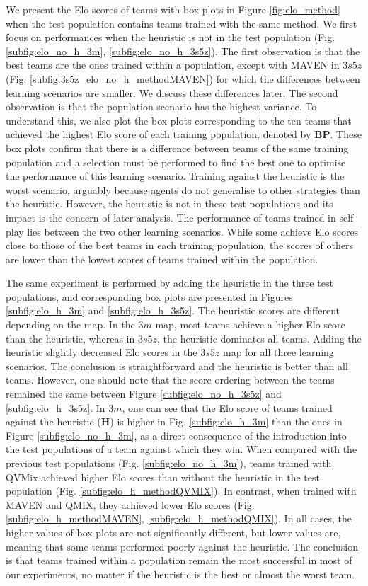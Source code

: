 We present the Elo scores of teams with box plots in Figure \ref{fig:elo_method} when the test population contains teams trained with the same method.
We first focus on performances when the heuristic is not in the test population (Fig. \ref{subfig:elo_no_h_3m}, \ref{subfig:elo_no_h_3s5z}).
The first observation is that the best teams are the ones trained within a population, except with MAVEN in $3s5z$ (Fig. \ref{subfig:3s5z_elo_no_h_methodMAVEN}) for which the differences between learning scenarios are smaller.
We discuss these differences later.
The second observation is that the population scenario has the highest variance.
To understand this, we also plot the box plots corresponding to the ten teams that achieved the highest Elo score of each training population, denoted by \textbf{BP}.
These box plots confirm that there is a difference between teams of the same training population and a selection must be performed to find the best one to optimise the performance of this learning scenario.
Training against the heuristic is the worst scenario, arguably because agents do not generalise to other strategies than the heuristic.
However, the heuristic is not in these test populations and its impact is the concern of later analysis.
The performance of teams trained in self-play lies between the two other learning scenarios.
While some achieve Elo scores close to those of the best teams in each training population, the scores of others are lower than the lowest scores of teams trained within the population.

The same experiment is performed by adding the heuristic in the three test populations, and corresponding box plots are presented in Figures \ref{subfig:elo_h_3m} and \ref{subfig:elo_h_3s5z}.
The heuristic scores are different depending on the map.
In the $3m$ map, most teams achieve a higher Elo score than the heuristic, whereas in $3s5z$, the heuristic dominates all teams.
Adding the heuristic slightly decreased Elo scores in the $3s5z$ map for all three learning scenarios.
The conclusion is straightforward and the heuristic is better than all teams.
However, one should note that the score ordering between the teams remained the same between Figure \ref{subfig:elo_no_h_3s5z} and \ref{subfig:elo_h_3s5z}.
In $3m$, one can see that the Elo score of teams trained against the heuristic (\textbf{H}) is higher in Fig. \ref{subfig:elo_h_3m} than the ones in Figure \ref{subfig:elo_no_h_3m}, as a direct consequence of the introduction into the test populations of a team against which they win.
When compared with the previous test populations (Fig. \ref{subfig:elo_no_h_3m}), teams trained with QVMix achieved higher Elo scores than without the heuristic in the test population (Fig. \ref{subfig:elo_h_methodQVMIX}).
In contrast, when trained with MAVEN and QMIX, they achieved lower Elo scores (Fig. \ref{subfig:elo_h_methodMAVEN}, \ref{subfig:elo_h_methodQMIX}).
In all cases, the higher values of box plots are not significantly different, but lower values are, meaning that some teams performed poorly against the heuristic.
The conclusion is that teams trained within a population remain the most successful in most of our experiments, no matter if the heuristic is the best or almost the worst team.

